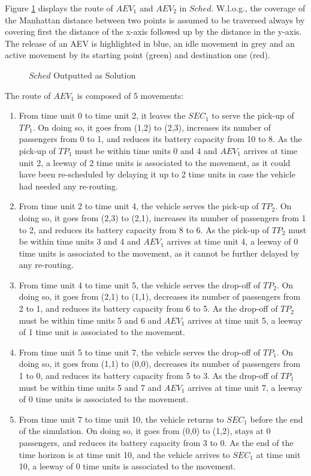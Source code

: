 Figure \ref{fig:sched_instance_example} displays the route of $AEV_1$ and $AEV_2$ in $Sched$. W.l.o.g.,  the coverage of the Manhattan distance between two points is assumed to be traversed always by covering first the distance of the x-axis followed up by the distance in the y-axis.  The release of an AEV is highlighted in blue, an idle movement in grey and an active movement  by its starting point (green) and destination one (red). 
\begin{figure}[b]
  \vspace{-0.2cm}
  \centering
   {}
  \caption{$Sched$ Outputted as Solution}
  \label{fig:sched_instance_example}
    \vspace{-0.1cm}
\end{figure}	
	
The route of $AEV_1$ is composed of 5 movements:									 										 			
\begin{enumerate}
\item From time unit 0 to time unit 2, it leaves the $SEC_1$ to serve the pick-up of $TP_1$.  On doing so,  it goes from (1,2) to (2,3), increases its number of passengers from 0 to 1, and reduces its battery capacity from 10 to 8.  As the pick-up of $TP_1$ must be within time units 0 and 4 and $AEV_1$ arrives at time unit 2,  a leeway of 2 time units is associated to the movement, as it could have been re-scheduled by delaying it up to 2 time units in case the vehicle had needed any re-routing. 
\item From time unit 2 to time unit 4, the vehicle serves the pick-up of $TP_2$.  On doing so,  it goes from (2,3) to (2,1), increases its number of passengers from 1 to 2, and reduces its battery capacity from 8 to 6.  As the pick-up of $TP_2$ must be within time units 3 and 4 and $AEV_1$ arrives at time unit 4,  a leeway of 0 time units is associated to the movement, as it cannot be further delayed by any re-routing.
\item From time unit 4 to time unit 5, the vehicle serves the drop-off of $TP_2$.  On doing so,  it goes from (2,1) to (1,1), decreases its number of passengers from 2 to 1, and reduces its battery capacity from 6 to 5.  As the drop-off of $TP_2$ must be within time units 5 and 6 and $AEV_1$ arrives at time unit 5,  a leeway of 1 time unit is associated to the movement.
\item From time unit 5 to time unit 7, the vehicle serves the drop-off of $TP_1$.  On doing so,  it goes from (1,1) to (0,0), decreases its number of passengers from 1 to 0, and reduces its battery capacity from 5 to 3.  As the drop-off of $TP_1$ must be within time units 5 and 7 and $AEV_1$ arrives at time unit 7,  a leeway of 0 time units is associated to the movement.
\item From time unit 7 to time unit 10, the vehicle returns to $SEC_1$ before the end of the simulation.  On doing so,  it goes from (0,0) to (1,2), stays at 0 passengers, and reduces its battery capacity from 3 to 0.  As the end of the time horizon is at time unit 10, and the vehicle arrives to $SEC_1$ at time unit 10,  a leeway of 0 time units is associated to the movement.
\end{enumerate}

